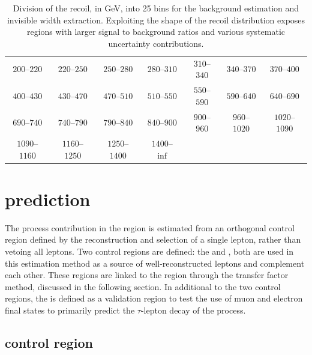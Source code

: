 \begin{table}[htb]
    \centering
    \begin{tabular}{ccccccc}
        $200$--$220$ & $220$--$250$ & $250$--$280$ & $280$--$310$ & $310$--$340$ & $340$--$370$ & $370$--$400$ \\
        $400$--$430$ & $430$--$470$ & $470$--$510$ & $510$--$550$ & $550$--$590$ & $590$--$640$ & $640$--$690$ \\
        $690$--$740$ & $740$--$790$ & $790$--$840$ & $840$--$900$ & $900$--$960$ & $960$--$1020$ & $1020$--$1090$ \\
        $1090$--$1160$ & $1160$--$1250$ & $1250$--$1400$ & $1400$--$\inf$
    \end{tabular}
    \caption[Recoil bins.]{
        Division of the recoil, in GeV, into 25 bins for the background estimation and \PZ invisible width extraction. Exploiting the shape of the recoil distribution exposes regions with larger signal to background ratios and various systematic uncertainty contributions.
    }
    \label{tab:met-bins}
\end{table}

\section{\IWlv prediction}\label{sec:wjets-prediction}

The \IWlv process contribution in the \metplusjets region is estimated from an orthogonal control region defined by the reconstruction and selection of a single lepton, rather than vetoing all leptons. Two control regions are defined: the \muplusjets and \eleplusjets, both are used in this estimation method as a source of well-reconstructed leptons and complement each other.  These regions are linked to the \metplusjets region through the transfer factor method, discussed in the following section. In additional to the two control regions, the \tauplusjets is defined as a validation region to test the use of muon and electron final states to primarily predict the $\tau$-lepton decay of the \IWlv process.


\subsection{\muplusjets control region}

